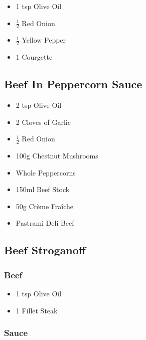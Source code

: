 \documentclass[11pt, english]{article}
\begin{document}
	\begin{itemize}
        \setlength\itemsep{0cm}
		\item 1 tsp Olive Oil
		\item $\frac{1}{2}$ Red Onion
		\item $\frac{1}{2}$ Yellow Pepper
		\item 1 Courgette
        \end{itemize}

\newpage

	\subsection{Beef In Peppercorn Sauce}

	\begin{itemize}
        \setlength\itemsep{0cm}
		\item 2 tsp Olive Oil
		\item 2 Cloves of Garlic
		\item $\frac{1}{2}$ Red Onion
		\item 100g Chestnut Mushrooms
		\item Whole Peppercorns
		\item 150ml Beef Stock
		\item 50g Cr\`{e}me Fra\^{i}che 
		\item Pastrami Deli Beef
        \end{itemize}

\newpage

	\subsection{Beef Stroganoff}

		\subsubsection*{Beef}

	\begin{itemize}
        \setlength\itemsep{0cm}
                \item 1 tsp Olive Oil
		\item 1 Fillet Steak
        \end{itemize}

		\subsubsection*{Sauce}
\end{document}
